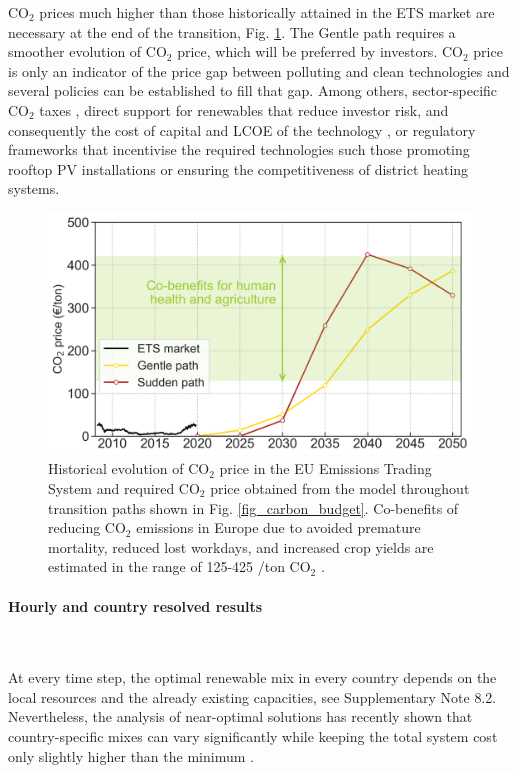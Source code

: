 \documentclass[5p]{elsarticle} %
\begin{document}
CO$_2$ prices much higher than those historically attained in the ETS market are necessary at the end of the transition, Fig. \ref{fig_co2price}. The Gentle path requires a smoother evolution of CO$_2$ price, which will be preferred by investors. CO$_2$ price is only an indicator of the price gap between polluting and clean technologies and several policies can be established to fill that gap. Among others, sector-specific CO$_2$ taxes \cite{Carbon_pricing_2019}, direct support for renewables that reduce investor risk, and consequently the cost of capital and LCOE of the technology \cite{Vartiainen_2019}, or regulatory frameworks that incentivise the required technologies such those promoting rooftop PV installations or ensuring the competitiveness of district heating systems. 

\begin{figure}[!h]
\centering
\includegraphics[width=\columnwidth]{../figures/co2_price.png}
\caption{Historical evolution of CO$_2$ price in the EU Emissions Trading System \cite{ETS} and required CO$_2$ price obtained from the model throughout transition paths shown in Fig. \ref{fig_carbon_budget}. 
Co-benefits of reducing CO$_2$ emissions in Europe due to avoided premature mortality, reduced lost workdays, and increased crop yields are estimated in the range of 125-425 \EUR/ton CO$_2$ \cite{Vandyck_2018}.} \label{fig_co2price} 
\end{figure}

\paragraph{\textbf{Hourly and country resolved results}} \

At every time step, the optimal renewable mix in every country depends on the local resources and the already existing capacities, see Supplementary Note 8.2. Nevertheless, the analysis of near-optimal solutions has recently shown that country-specific mixes can vary significantly while keeping the total system cost only slightly higher than the minimum \cite{Neumann_2019}. \\
\end{document}
